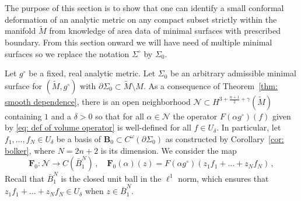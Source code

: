 \documentclass[11pt]{amsart}
\theoremstyle{definition}
\numberwithin{equation}{section}
\newcommand{\p}{\partial}
\newcommand{\BB}{\mathbf B}
\begin{document}
The purpose of this section is to show that one can identify a small conformal deformation of an analytic metric on any compact subset strictly within the manifold $\widetilde{M}$ from knowledge of area data of minimal surfaces with prescribed boundary. From this section onward we will have need of multiple minimal surfaces so we replace the notation $\Sigma^\circ$ by $\Sigma_0$.

Let $g^\circ$ be a fixed, real analytic metric. Let $\Sigma_0$ be an arbitrary admissible minimal surface for $(\widetilde{M},g^\circ)$ with $\p\Sigma_0\subset \widetilde{M}\setminus M$. As a consequence of Theorem~\ref{thm: smooth dependence}, there is an open neighborhood $\mathcal{N}\subset H^{3+\frac{n+1}{2}+\gamma}(\widetilde{M})$ containing $1$ and a $\delta >0$ so that for all $\alpha \in \mathcal{N}$ the operator $F(\alpha g^\circ)(f)$ given by \eqref{eq: def of volume operator} is well-defined for all $f\in U_\delta$. In particular, let $f_1,\dots,f_{N} \in U_\delta$ be a basis of $\BB_0\subset C^{\omega}(\partial \Sigma_0)$ as constructed by Corollary~\ref{cor: bolker}, where $N=2n+2$ is its dimension. We consider the map
\begin{equation}\label{eq:boldF0}
	\mathbf{F}_0 \colon  \mathcal{N} \to C(\bar{B}_1^{N})\,,\quad \mathbf{F}_0(\alpha)(z) = F(\alpha g^\circ)(z_1f_1 + \dots + z_{N}f_{N})\,,
\end{equation}
Recall that $\bar{B}_1^{N}$ is the closed unit ball in the $\ell^1$ norm, which ensures that $z_1f_1 + \dots + z_{N}f_{N}\in U_\delta$ when $z \in \bar{B}_1^{N}$. 
\end{document}
